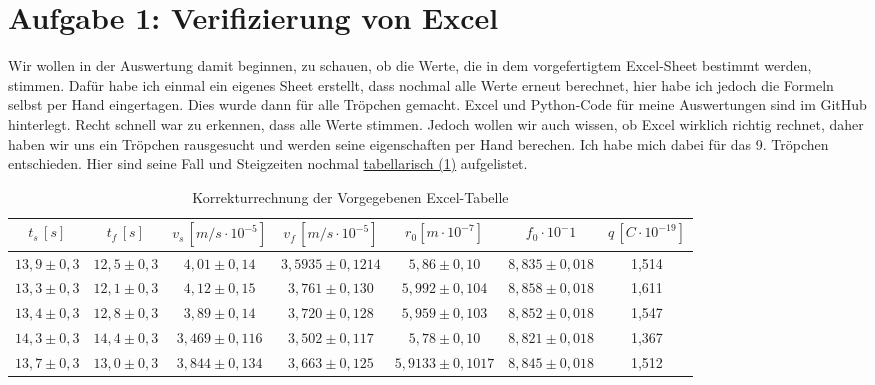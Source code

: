 \twocolumn


\section{Aufgabe 1: Verifizierung von Excel}
Wir wollen in der Auswertung damit beginnen, zu schauen, ob die Werte, die in dem vorgefertigtem Excel-Sheet bestimmt werden, stimmen. Dafür habe ich einmal ein 
eigenes Sheet erstellt, dass nochmal alle Werte erneut berechnet, hier habe ich jedoch die Formeln selbst per Hand eingertagen. Dies wurde dann für alle Tröpchen gemacht.
Excel und Python-Code für meine Auswertungen sind im GitHub \cite{githubPAP1} hinterlegt. Recht schnell war zu erkennen, dass alle Werte stimmen. 
Jedoch wollen wir auch wissen, ob Excel wirklich richtig rechnet, daher haben wir uns ein Tröpchen rausgesucht und werden seine eigenschaften per Hand berechen.
Ich habe mich dabei für das 9. Tröpchen entschieden. Hier sind seine Fall und Steigzeiten nochmal \hyperref[tab:testing]{tabellarisch (\ref*{tab:testing})} aufgelistet.
\begin{table}[b]
    \onecolumn
    \hspace*{-1.1cm}
    \centering
    \begin{tabular}{ c | c | c | c | c | c | c}
        \toprule
        $t_s \,  [s]$ & $t_f \,  [s]$ & $v_s \,  [m/s \cdot 10^{-5}]$ & $v_f \,  [m/s \cdot 10^{-5}]$ & $r_0 [m\cdot 10^{-7}]$ & $f_0 \cdot 10^-{1}$ & $q \, [C \cdot 10^{-19}]$ \\
        \midrule
        $13,9 \pm 0,3$ & $12,5 \pm 0,3$ & $4,01 \pm 0,14$ & $3,5935 \pm 0,1214$ & $5,86 \pm 0,10$ & $8,835 \pm 0,018$ & 1,514 \\
        $13,3 \pm 0,3$ & $12,1 \pm 0,3$ & $4,12 \pm 0,15$ & $3,761 \pm 0,130$ & $5,992 \pm 0,104$ & $8,858 \pm 0,018$ & 1,611 \\
        $13,4 \pm 0,3$ & $12,8 \pm 0,3$ & $3,89 \pm 0,14$ & $3,720 \pm 0,128$ & $5,959 \pm 0,103$ & $8,852 \pm 0,018$ & 1,547 \\
        $14,3 \pm 0,3$ & $14,4 \pm 0,3$ & $3,469 \pm 0,116$ & $3,502 \pm 0,117$ & $5,78 \pm 0,10$ & $8,821 \pm 0,018$ & 1,367 \\
        $13,7 \pm 0,3$ & $13,0 \pm 0,3$ & $3,844 \pm 0,134$ & $3,663 \pm 0,125$ & $5,9133 \pm 0,1017$ & $8,845 \pm 0,018$ & 1,512 \\
        \bottomrule
    \end{tabular}
    \label{tab:testing}
    \caption{Korrekturrechnung der Vorgegebenen Excel-Tabelle}
    \twocolumn
\end{table}

